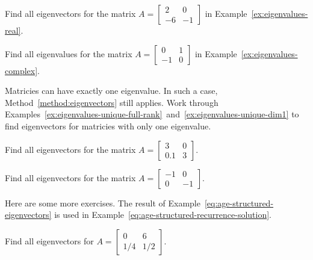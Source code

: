 \documentclass[../main.tex]{subfiles}
\begin{document}
\begin{example}
  Find all eigenvectors for the matrix \(A = \begin{bmatrix} 2 & 0 \\ -6 & -1\end{bmatrix}\) in Example~\ref{ex:eigenvalues-real}.
\end{example}
\clearpage

\begin{example}
  Find all eigenvalues for the matrix \(A = \begin{bmatrix} 0 & 1 \\ -1 & 0 \end{bmatrix}\) in Example~\ref{ex:eigenvalues-complex}.
\end{example}

\clearpage

\faStar{} Matricies can have exactly one eigenvalue. In such a case, Method~\ref{method:eigenvectors} still applies. Work through Examples~\ref{ex:eigenvalues-unique-full-rank}~and~\ref{ex:eigenvalues-unique-dim1} to find eigenvectors for matricies with only one eigenvalue.
\begin{example} \label{ex:eigenvalues-unique-full-rank}
  Find all eigenvectors for the matrix \(A = \begin{bmatrix} 3 & 0 \\ 0.1 & 3 \end{bmatrix}\).
\end{example}

\begin{example} \label{ex:eigenvalues-unique-dim1}
  Find all eigenvectors for the matrix \(A = \begin{bmatrix} -1 & 0 \\ 0 & -1 \end{bmatrix}\).
\end{example}
\clearpage

Here are some more exercises.  The result of Example~\ref{eq:age-structured-eigenvectors} is used in Example~\ref{eq:age-structured-recurrence-solution}.

\begin{example} \label{eq:age-structured-eigenvectors}
  Find all eigenvectors for \(A = \begin{bmatrix} 0 & 6 \\ 1/4 & 1/2 \end{bmatrix}\).

\end{example}
\end{document}
